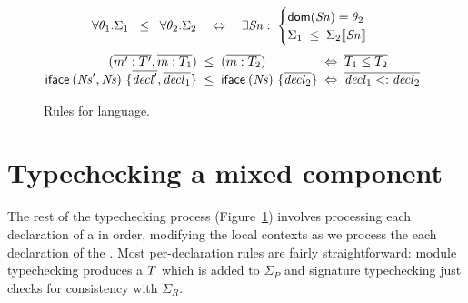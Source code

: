 \begin{figure}[t]


\[
  \forall\theta_1.\Sigma_1 \;\;\le\;\; \forall\theta_2.\Sigma_2
  \quad\Leftrightarrow\quad
  \exists \mathit{Sn} :\;
    \begin{cases}
      \mathsf{dom}(\mathit{Sn}) = \theta_2 \\
      \Sigma_1 \;\le\; \Sigma_2\llbracket\mathit{Sn}\rrbracket
    \end{cases}
\]
\[
\begin{array}{@{}r@{\;\;}c@{\;\;}l@{\;\;}c@{\;\;}l}
  (\overline{m':\Umty'},\overline{m:\Umty_1})
    &\le&
    (\overline{m:\Umty_2})
      &\Leftrightarrow&
      \overline{\Umty_1 \le \Umty_2}
  \\
  \UobjTau{\UNs',\UNs}{\overline{\Uty'},\overline{\Uty_1}}
    &\le&
    \UobjTau{\UNs}{\overline{\Uty_2}}
      &\Leftrightarrow&
      \overline{\Uty_1 <: \Uty_2}
\end{array}
\]

\caption{Rules for \unit{} language.}
\label{fig:unit-ty-rules}
\end{figure}

\section{Typechecking a mixed component}

The rest of the typechecking process (Figure~\ref{fig:unit-ty-rules})
involves processing each declaration of a \unit{} in order, modifying
the local contexts as we process the each declaration of the \unit{}.
Most per-declaration rules are fairly straightforward: module
typechecking produces a $T$ which is added to $\Sigma_P$ and signature
typechecking just checks for consistency with $\Sigma_R$.

